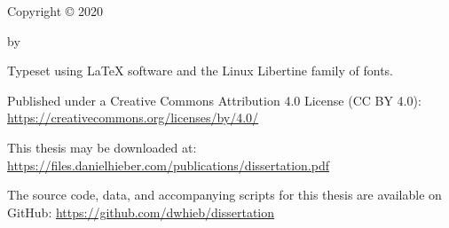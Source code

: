 \setcounter{page}{3}

\vspace*{\fill}

\begin{center}

  \thetitle

  \vspace{3em}

  Copyright {\copyright} 2020

  by

  \theauthor

\end{center}

\vspace*{\fill}

\begin{flushleft}
\begin{singlespacing}

  \setlength{\parskip}{0.5em}

  Typeset using {\LaTeX} software and the Linux Libertine family of fonts.

  Published under a Creative Commons Attribution 4.0 License (CC BY 4.0): \href{https://creativecommons.org/licenses/by/4.0/}{https://creativecommons.org/licenses/by/4.0/}

  This thesis may be downloaded at: \href{https://files.danielhieber.com/publications/dissertation.pdf}{https://files.danielhieber.com/publications/dissertation.pdf}

  The source code, data, and accompanying scripts for this thesis are available on GitHub: \href{https://github.com/dwhieb/dissertation}{https://github.com/dwhieb/dissertation}

  \setlength{\parskip}{0em}

\end{singlespacing}
\end{flushleft}
